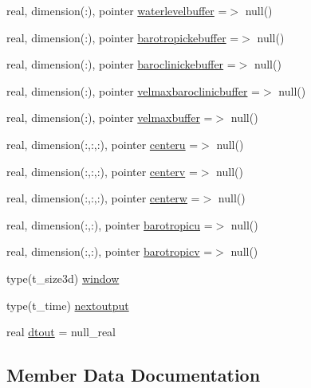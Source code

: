 \begin{DoxyCompactItemize}
\item 
real, dimension(\+:), pointer \mbox{\hyperlink{structmodulehydrodynamic_1_1t__energy_a497dca88f2d5d4b76afab1c683d23e4d}{waterlevelbuffer}} =$>$ null()
\item 
real, dimension(\+:), pointer \mbox{\hyperlink{structmodulehydrodynamic_1_1t__energy_ab2cfbcfb8ad4c7f16ddc336028c52ff0}{barotropickebuffer}} =$>$ null()
\item 
real, dimension(\+:), pointer \mbox{\hyperlink{structmodulehydrodynamic_1_1t__energy_aa02187118684e3245fb55e6f911ef4c6}{baroclinickebuffer}} =$>$ null()
\item 
real, dimension(\+:), pointer \mbox{\hyperlink{structmodulehydrodynamic_1_1t__energy_a548498c24ac6a3ee62dd49d7500ffb33}{velmaxbaroclinicbuffer}} =$>$ null()
\item 
real, dimension(\+:), pointer \mbox{\hyperlink{structmodulehydrodynamic_1_1t__energy_a283e730661689292da64b895e16eefa4}{velmaxbuffer}} =$>$ null()
\item 
real, dimension(\+:,\+:,\+:), pointer \mbox{\hyperlink{structmodulehydrodynamic_1_1t__energy_af7f3b7916654c3443987cc3690b9055b}{centeru}} =$>$ null()
\item 
real, dimension(\+:,\+:,\+:), pointer \mbox{\hyperlink{structmodulehydrodynamic_1_1t__energy_a52ba877ed896e98cc0188f8f7bec5f8d}{centerv}} =$>$ null()
\item 
real, dimension(\+:,\+:,\+:), pointer \mbox{\hyperlink{structmodulehydrodynamic_1_1t__energy_a3cef0437d07773d05432495d7683fa34}{centerw}} =$>$ null()
\item 
real, dimension(\+:,\+:), pointer \mbox{\hyperlink{structmodulehydrodynamic_1_1t__energy_a2450611c330ac534efa6608a5157c025}{barotropicu}} =$>$ null()
\item 
real, dimension(\+:,\+:), pointer \mbox{\hyperlink{structmodulehydrodynamic_1_1t__energy_aecf7f4c06ef8286e04aa76f2acc9886d}{barotropicv}} =$>$ null()
\item 
type(t\+\_\+size3d) \mbox{\hyperlink{structmodulehydrodynamic_1_1t__energy_a7759cfb1ad8f97e037ff5f4d1ae44ebe}{window}}
\item 
type(t\+\_\+time) \mbox{\hyperlink{structmodulehydrodynamic_1_1t__energy_aebdef095cda54d9f26d0ecfbf423d7c9}{nextoutput}}
\item 
real \mbox{\hyperlink{structmodulehydrodynamic_1_1t__energy_a8287cf86971ca1c562d26ba74f7c3d8d}{dtout}} = null\+\_\+real
\end{DoxyCompactItemize}


\subsection{Member Data Documentation}
\mbox{\label{structmodulehydrodynamic_1_1t__energy_aa02187118684e3245fb55e6f911ef4c6}} 
